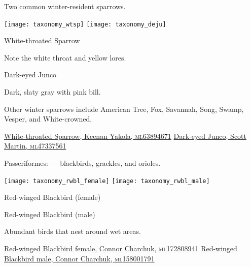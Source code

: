 \documentclass[t]{beamer}
\newcommand{\backoneline}{\vspace{-\baselineskip}}
\begin{document}
%

\begin{frame}{Two common winter-resident sparrows.}
	
	\texttt{[image: taxonomy\_wtsp]}\hfill
	\texttt{[image: taxonomy\_deju]}
	
	\backoneline
	
	\begin{multicols}{2}
		
		White-throated Sparrow

		\medskip
		
		Note the white throat and yellow lores.
						
		\columnbreak
		
		Dark-eyed Junco
		
		\medskip
		
		Dark, slaty gray with pink bill.
		
	\end{multicols}	
	
	Other winter sparrows include American Tree, Fox, Savannah, Song, Swamp, Vesper, and White-crowned.
	
	\vfilll
	
	\tiny
	
	\href{https://macaulaylibrary.org/asset/63894671}{White-throated Sparrow, Keenan Yakola, \textsc{ml}63894671} \hfill 
	\href{https://macaulaylibrary.org/asset/47337561}{Dark-eyed Junco, Scott Martin, \textsc{ml}47337561}
	
\end{frame}

%

\begin{frame}{Passeriformes:  — blackbirds, grackles, and orioles.}
	
		\texttt{[image: taxonomy\_rwbl\_female]}\hfill
		\texttt{[image: taxonomy\_rwbl\_male]}
	
		\backoneline
		
		\begin{multicols}{2}
				Red-winged Blackbird (female)
								
				\columnbreak
				
				Red-winged Blackbird (male)
				
			\end{multicols}	
		
		Abundant birds that nest around wet areas.
		
		\vfilll
		
		\tiny
		
		\href{https://macaulaylibrary.org/asset/172808941}{Red-winged Blackbird female, Connor Charchuk, \textsc{ml}172808941} \hfill 
		\href{https://macaulaylibrary.org/asset/158001791}{Red-winged Blackbird male, Connor Charchuk, \textsc{ml}158001791}
	
\end{frame}
\end{document}
